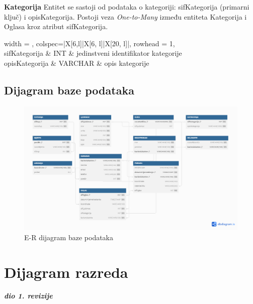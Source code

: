 				
				\noindent \textbf{Kategorija} Entitet se sastoji od podataka o kategoriji: sifKategorija (primarni ključ) i opisKategorija. Postoji veza \textit{One-to-Many} između entiteta Kategorija i Oglasa kroz atribut sifKategorija.
				
				
				\begin{longtblr}[
					label=none,
					entry=none
					]{
						width = \textwidth,
						colspec={|X[6,l]|X[6, l]|X[20, l]|}, 
						rowhead = 1,
					} %
					\hline {}	 \\ \hline[3pt]
					sifKategorija & INT	&  	jedinstveni identifikator kategorije  	\\ \hline
					opisKategorija	& VARCHAR & opis kategorije  	\\ \hline 
				\end{longtblr}
				
			
			\subsection{Dijagram baze podataka}
				\begin{figure}[h]
					\centering
					\includegraphics[width=1\textwidth]{slike/ERdiagram.png}
					\caption{E-R dijagram baze podataka}
					\label{fig:mesh1}
				\end{figure}
			
			\eject
			
			
		\section{Dijagram razreda}
			
			\textbf{\textit{dio 1. revizije}}\\
			
